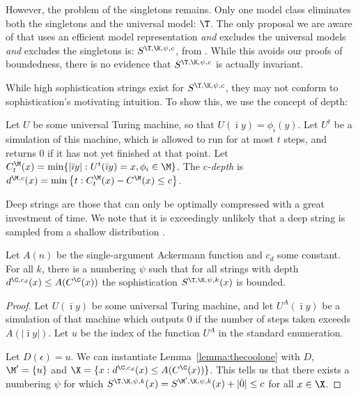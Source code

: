 However, the problem of the singletons remains. Only one model class eliminates both the singletons and the universal model: $\T$. The only proposal we are aware of that uses an efficient model representation \emph{and} excludes the universal models \emph{and} excludes the singletons is: $S^{\T,\K,\psi,c}$, from \cite{vitanyi2004meaningful}. While this avoids our proofs of boundedness, there is no evidence that $S^{\T,\K,\psi, c}$ is actually invariant.

While high sophistication strings exist for $S^{\T,\K,\psi, c}$, they may not conform to sophistication's motivating intuition. To show this, we use the concept of depth:

\begin{definition}\belowdisplayskip=-12pt
Let $U$ be some universal Turing machine, so that $U(\bar\imath y) = \phi_i(y)$. Let $U^t$ be a simulation of this machine, which is allowed to run for at most $t$ steps, and returns $0$ if it has not yet finished at that point. Let $C^\M_t(x) = \min\{|\bar\imath y| : U^t(\bar\imath y) = x, \phi_i \in \M\}$. The \emph{$c$-depth} is $d^{\M,c}(x) = \min \left\{t : C^\M_t(x) - C^\M(x) \leq c \right\}$.
\end{definition}
Deep strings are those that can only be optimally compressed with a great investment of time. We note that it is exceedingly unlikely that a deep string is sampled from a shallow distribution \cite{bloem2014safe,bennett1988logical}. 
 
\begin{theorem}
Let $A(n)$ be the single-argument Ackermann function and $c_d$ some constant. For all $k$, there is a numbering $\psi$ such that for all strings with depth $d^{\C,c_d}(x) \leq A(C^\C(x))$ the sophistication $S^{\T, \K, \psi, k}(x)$ is bounded.\label{thm:depth}
\end{theorem}

\begin{proof}
Let $U(\bar\imath y)$ be some universal Turing machine, and let $U^A(\bar\imath y)$ be a simulation of that machine which outputs $0$ if the number of steps taken exceeds $A(|\bar\imath y|)$. Let $u$ be the index of the function $U^A$ in the standard enumeration.

Let $D(\epsilon) = u$. We can instantiate Lemma~\ref{lemma:thecoolone} with $D$, $\M' = \{u\}$ and $\X = \{x : d^{\C,c_d}(x) \leq A(C^\C(x))\}$. This tells us that there exists a numbering $\psi$ for which $S^{\T, \K,\psi,k}(x) = S^{\M', \K, \psi, k}(x) + |\bar0| \leq c$ for all $x \in \X$.
\end{proof}

